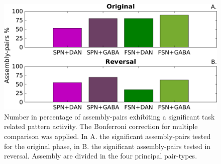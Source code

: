 \begin{figure}
    \centering
    \includegraphics[scale=0.5]{figures/PercFriedHitTrialsBFf.pdf}
    \caption{Number in percentage of assembly-pairs exhibiting a significant task related pattern activity. The Bonferroni correction for multiple comparison was applied. In A. the significant assembly-pairs tested for the original phase, in B. the significant assembly-pairs tested in reversal. Assembly are divided in the four principal pair-types.}
    \label{fig:PercAsFried}
\end{figure}
